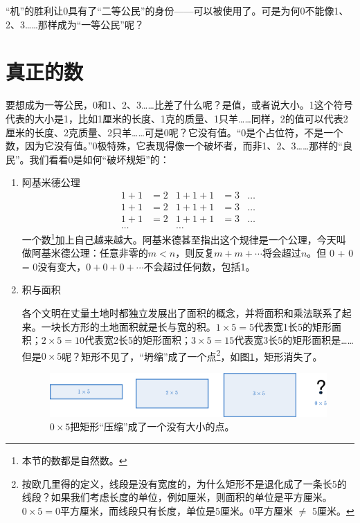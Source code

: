 \documentclass[b5paper]{ctexart}
\begin{document}
“机”的胜利让0具有了“二等公民”的身份——可以被使用了。可是为何0不能像1、2、3……那样成为“一等公民”呢？

\section{真正的数}

要想成为一等公民，0和1、2、3……比差了什么呢？是值，或者说大小。1这个符号代表的大小是1，比如1厘米的长度、1克的质量、1只羊……同样，2的值可以代表2厘米的长度、2克质量、2只羊……可是0呢？它没有值。“0是个占位符，不是一个数，因为它没有值\cite{Seife-2000}。”0极特殊，它表现得像一个破坏者，而非1、2、3……那样的“良民”。我们看看0是如何“破坏规矩”的：

\begin{enumerate}[(1)]
\item 阿基米德公理
\begin{align*}
1 + 1 &= 2   & 1 + 1 + 1 &= 3 & \dots \\
1 + 1 &= 2   & 1 + 1 + 1 &= 3 & \dots \\
1 + 1 &= 2   & 1 + 1 + 1 &= 3 & \dots \\
\dots &      & \dots     &    &
\end{align*}
一个数\footnote{本节的数都是自然数。}加上自己越来越大。阿基米德甚至指出这个规律是一个公理，今天叫做阿基米德公理：任意非零的$m < n$，则反复$m + m + \cdots$将会超过$n$。但 0 + 0 = 0没有变大，$0 + 0 + 0 + \cdots$不会超过任何数，包括1。

\item 积与面积

各个文明在丈量土地时都独立发展出了面积的概念，并将面积和乘法联系了起来。一块长方形的土地面积就是长与宽的积。$1 \times 5 = 5$代表宽1长5的矩形面积；$2 \times 5 = 10$代表宽2长5的矩形面积；$3 \times 5 = 15$代表宽3长5的矩形面积是……但是$0 \times 5$呢？矩形不见了，“坍缩”成了一个点\footnote{按欧几里得的定义，线段是没有宽度的，为什么矩形不是退化成了一条长5的线段？如果我们考虑长度的单位，例如厘米，则面积的单位是平方厘米。$0 \times 5 = 0$平方厘米，而线段只有长度，单位是5厘米。0平方厘米 $\neq$ 5厘米。}，如图\cref{fig:rectangle-vanish}，矩形消失了。

\begin{figure}[htbp]
 \centering
 \includegraphics[scale=0.6]{img/rectangles}
 \caption{$0 \times 5$把矩形“压缩”成了一个没有大小的点。}
 \label{fig:rectangle-vanish}
\end{figure}


\end{enumerate}
\end{document}
